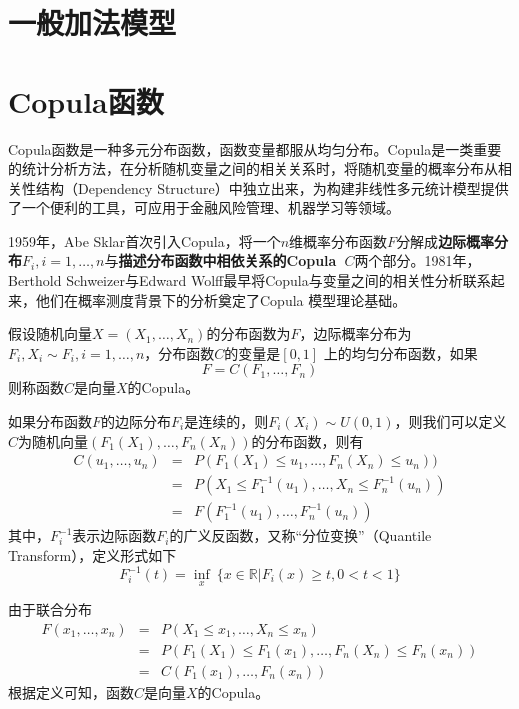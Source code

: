 \section{一般加法模型}%
\section{Copula函数}
Copula函数是一种多元分布函数，函数变量都服从均匀分布。Copula是一类重要的统计分析方法，在分析随机变量之间的相关关系时，将随机变量的概率分布从相关性结构（Dependency Structure）中独立出来，为构建非线性多元统计模型提供了一个便利的工具，可应用于金融风险管理、机器学习\cite{poczos2012copula}等领域。

1959年，Abe Sklar\cite{sklar1959fonctions}首次引入Copula，将一个$n$维概率分布函数$F$分解成\textbf{边际概率分布$F_i,i=1,\ldots,n$}与\textbf{描述分布函数中相依关系的Copula~$C$}两个部分。1981年，Berthold Schweizer与Edward Wolff\cite{schweizer1981nonparametric}最早将Copula与变量之间的相关性分析联系起来，他们在概率测度背景下的分析奠定了Copula 模型理论基础。
\begin{definition}[Copula]
假设随机向量$X=(X_1,\ldots,X_n)$的分布函数为$F$，边际概率分布为$F_i,X_i\sim F_i,i=1,\ldots,n$，分布函数$C$的变量是$[0,1]$ 上的均匀分布函数，如果
\begin{equation}
    F = C(F_1,\ldots,F_n)
\end{equation}
则称函数$C$是向量$X$的Copula。
\end{definition}

如果分布函数$F$的边际分布$F_i$是连续的，则$F_i(X_i)\sim U(0,1)$，则我们可以定义$C$为随机向量$(F_1(X_1), \ldots, F_n(X_n))$的分布函数，则有
\begin{equation}
    \begin{array}{lll}
      C(u_1,\ldots,u_n) & = & P(F_1(X_1)\le u_1, \ldots, F_n(X_n)\le u_n)) \\
       & = & P(X_1\le F_1^{-1}(u_1), \ldots, X_n\le F_n^{-1}(u_n)) \\
       & = & F(F_1^{-1}(u_1),\ldots, F_n^{-1}(u_n))
    \end{array}
\end{equation}
其中，$F_i^{-1}$表示边际函数$F_i$的广义反函数，又称“分位变换”（Quantile Transform），定义形式如下
\begin{equation}
    F_i^{-1}(t) = \inf\limits_{x}~\{x\in \mathbb R|F_i(x)\ge t, 0 < t < 1\}
\end{equation}

由于联合分布
\begin{equation}
    \begin{array}{lll}
      F(x_1,\ldots,x_n) & = & P(X_1\le x_1, \ldots, X_n\le x_n) \\
       & = & P(F_1(X_1) \le F_1(x_1), \ldots, F_n(X_n) \le F_n(x_n)) \\
       & = & C(F_1(x_1),\ldots, F_n(x_n))
    \end{array}
\end{equation}
根据定义可知，函数$C$是向量$X$的Copula。


